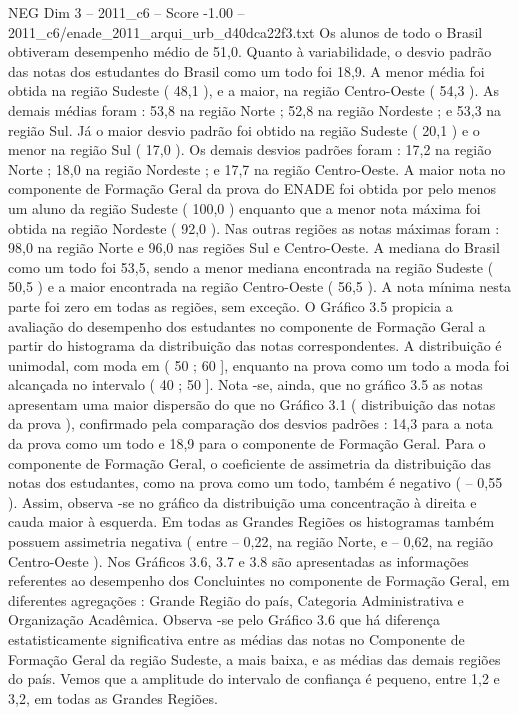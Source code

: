 \begin{textsample}{NEG Dim 3 – 2011\_c6 – Score -1.00 – 2011\_c6/enade\_2011\_arqui\_urb\_d40dca22f3.txt}
Os alunos de todo o Brasil obtiveram desempenho médio de 51,0.
Quanto à variabilidade, o desvio padrão das notas dos estudantes do Brasil como um todo foi 18,9.
A menor média foi obtida na região Sudeste ( 48,1 ), e a maior, na região Centro-Oeste ( 54,3 ).
As demais médias foram : 53,8 na região Norte ; 52,8 na região Nordeste ; e 53,3 na região Sul.
Já o maior desvio padrão foi obtido na região Sudeste ( 20,1 ) e o menor na região Sul ( 17,0 ).
Os demais desvios padrões foram : 17,2 na região Norte ; 18,0 na região Nordeste ; e 17,7 na região Centro-Oeste.
A maior nota no componente de Formação Geral da prova do ENADE foi obtida por pelo menos um aluno da região Sudeste ( 100,0 ) enquanto que a menor nota máxima foi obtida na região Nordeste ( 92,0 ).
Nas outras regiões as notas máximas foram : 98,0 na região Norte e 96,0 nas regiões Sul e Centro-Oeste.
A mediana do Brasil como um todo foi 53,5, sendo a menor mediana encontrada na região Sudeste ( 50,5 ) e a maior encontrada na região Centro-Oeste ( 56,5 ).
A nota mínima nesta parte foi zero em todas as regiões, sem exceção.
O Gráfico 3.5 propicia a avaliação do desempenho dos estudantes no componente de Formação Geral a partir do histograma da distribuição das notas correspondentes.
A distribuição é unimodal, com moda em ( 50 ; 60 ], enquanto na prova como um todo a moda foi alcançada no intervalo ( 40 ; 50 ].
Nota -se, ainda, que no gráfico 3.5 as notas apresentam uma maior dispersão do que no Gráfico 3.1 ( distribuição das notas da prova ), confirmado pela comparação dos desvios padrões : 14,3 para a nota da prova como um todo e 18,9 para o componente de Formação Geral.
Para o componente de Formação Geral, o coeficiente de assimetria da distribuição das notas dos estudantes, como na prova como um todo, também é negativo ( – 0,55 ).
Assim, observa -se no gráfico da distribuição uma concentração à direita e cauda maior à esquerda.
Em todas as Grandes Regiões os histogramas também possuem assimetria negativa ( entre – 0,22, na região Norte, e – 0,62, na região Centro-Oeste ).
Nos Gráficos 3.6, 3.7 e 3.8 são apresentadas as informações referentes ao desempenho dos Concluintes no componente de Formação Geral, em diferentes agregações : Grande Região do país, Categoria Administrativa e Organização Acadêmica.
Observa -se pelo Gráfico 3.6 que há diferença estatisticamente significativa entre as médias das notas no Componente de Formação Geral da região Sudeste, a mais baixa, e as médias das demais regiões do país.
Vemos que a amplitude do intervalo de confiança é pequeno, entre 1,2 e 3,2, em todas as Grandes Regiões.

\end{textsample}
